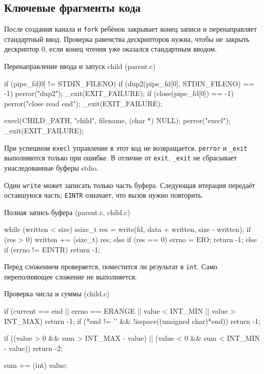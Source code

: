 \documentclass[12pt,a4paper]{article}
\begin{document}
\subsection{Ключевые фрагменты кода}
После создания канала и \texttt{fork} ребёнок закрывает конец записи и перенаправляет стандартный ввод. Проверка равенства дескрипторов нужна, чтобы не закрыть дескриптор 0, если конец чтения уже оказался стандартным вводом.
\begin{listingblock}{Перенаправление ввода и запуск child (parent.c)}
\begin{code}
if (pipe_fd[0] != STDIN_FILENO) {
    if (dup2(pipe_fd[0], STDIN_FILENO) == -1) {
        perror("dup2");
        _exit(EXIT_FAILURE);
    }
    if (close(pipe_fd[0]) == -1) {
        perror("close read end");
        _exit(EXIT_FAILURE);
    }
}

execl(CHILD_PATH, "child", filename, (char *) NULL);
perror("execl");
_exit(EXIT_FAILURE);
\end{code}
\end{listingblock}

При успешном \texttt{execl} управление в этот код не возвращается. \texttt{perror} и \texttt{\_exit} выполняются только при ошибке. В отличие от \texttt{exit}, \texttt{\_exit} не сбрасывает унаследованные буферы stdio.

Один \texttt{write} может записать только часть буфера. Следующая итерация передаёт оставшуюся часть; \texttt{EINTR} означает, что вызов нужно повторить.
\begin{listingblock}{Полная запись буфера (parent.c, child.c)}
\begin{code}
while (written < size) {
    ssize_t res = write(fd, data + written, size - written);
    if (res > 0) {
        written += (size_t) res;
    } else if (res == 0) {
        errno = EIO;
        return -1;
    } else if (errno != EINTR) {
        return -1;
    }
}
\end{code}
\end{listingblock}

Перед сложением проверяется, поместится ли результат в \texttt{int}. Само переполняющее сложение не выполняется.
\begin{listingblock}{Проверка числа и суммы (child.c)}
\begin{code}
if (current == end || errno == ERANGE ||
    value < INT_MIN || value > INT_MAX) return -1;
if (*end != '\0' && !isspace((unsigned char)*end)) return -1;

if ((value > 0 && sum > INT_MAX - value) ||
    (value < 0 && sum < INT_MIN - value)) return -2;

sum += (int) value;
\end{code}
\end{listingblock}
\end{document}
